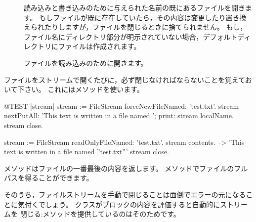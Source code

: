 \documentclass[a4paper,10pt,twoside]{book}
\begin{document}
\begin{description}
\item[] 読み込みと書き込みのために与えられた名前の既にあるファイルを開きます。
  もしファイルが既に存在していたら，その内容は変更したり置き換えられたりしますが，ファイルを閉じるときに捨てられません。
  もし，ファイル名にディレクトリ部分が明示されていない場合，デフォルトディレクトリにファイルは作成されます。

\item[] ファイルを読み込みのために開きます。


\end{description}

ファイルをストリームで開くたびに，必ず閉じなければならないことを覚えておいて下さい。
これにはメソッドを使います。


\begin{code}{@TEST |stream|}
stream := FileStream forceNewFileNamed: 'test.txt'.
stream
    nextPutAll: 'This text is written in a file named ';
    print: stream localName.
stream close.

stream := FileStream readOnlyFileNamed: 'test.txt'.
stream contents. --> 'This text is written in a file named ''test.txt'''
stream close.
\end{code}

%

メソッドはファイルの一番最後の内容を返します。
メソッドでファイルのフルパスを得ることができます。


そのうち，ファイルストリームを手動で閉じることは面倒でエラーの元になることに気付くでしょう。
クラスがブロックの内容を評価すると自動的にストリームを
閉じる:メソッドを提供しているのはそのためです。
\end{document}
